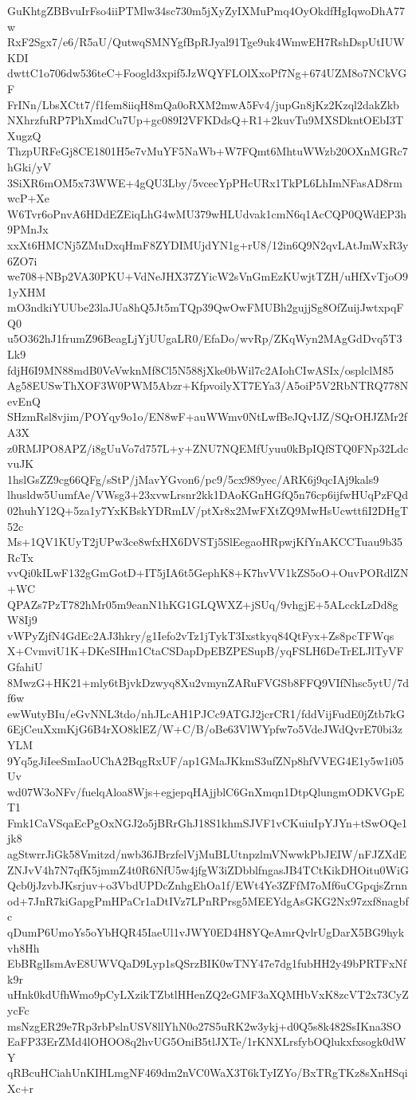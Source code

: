 GuKhtgZBBvuIrFso4iiPTMlw34sc730m5jXyZyIXMuPmq4OyOkdfHgIqwoDhA77w
RxF2Sgx7/e6/R5aU/QutwqSMNYgfBpRJyal91Tge9uk4WmwEH7RshDspUtIUWKDI
dwttC1o706dw536teC+Foogld3xpif5JzWQYFLOlXxoPf7Ng+674UZM8o7NCkVGF
FrINn/LbsXCtt7/f1fem8iiqH8mQa0oRXM2mwA5Fv4/jupGn8jKz2Kzql2dakZkb
NXhrzfuRP7PhXmdCu7Up+gc089I2VFKDdsQ+R1+2kuvTu9MXSDkntOEbI3TXugzQ
ThzpURFeGj8CE1801H5e7vMuYF5NaWb+W7FQmt6MhtuWWzb20OXnMGRc7hGki/yV
3SiXR6mOM5x73WWE+4gQU3Lby/5vcecYpPHcURx1TkPL6LhImNFasAD8rmwcP+Xe
W6Tvr6oPnvA6HDdEZEiqLhG4wMU379wHLUdvak1cmN6q1AcCQP0QWdEP3h9PMnJx
xxXt6HMCNj5ZMuDxqHmF8ZYDIMUjdYN1g+rU8/12in6Q9N2qvLAtJmWxR3y6ZO7i
we708+NBp2VA30PKU+VdNeJHX37ZYicW2sVnGmEzKUwjtTZH/uHfXvTjoO91yXHM
mO3ndkiYUUbe23laJUa8hQ5Jt5mTQp39QwOwFMUBh2gujjSg8OfZuijJwtxpqFQ0
u5O362hJ1frumZ96BeagLjYjUUgaLR0/EfaDo/wvRp/ZKqWyn2MAgGdDvq5T3Lk9
fdjH6I9MN88mdB0VeVwknMf8Cl5N588jXke0bWil7c2AIohCIwASIx/osplclM85
Ag58EUSwThXOF3W0PWM5Abzr+KfpvoilyXT7EYa3/A5oiP5V2RbNTRQ778NevEnQ
SHzmRsl8vjim/POYqy9o1o/EN8wF+auWWmv0NtLwfBeJQvIJZ/SQrOHJZMr2fA3X
z0RMJPO8APZ/i8gUuVo7d757L+y+ZNU7NQEMfUyuu0kBpIQfSTQ0FNp32LdcvuJK
1hslGsZZ9cg66QFg/sStP/jMavYGvon6/pc9/5cx989yec/ARK6j9qcIAj9kals9
lhusldw5UumfAe/VWsg3+23xvwLrsnr2kk1DAoKGnHGfQ5n76cp6ijfwHUqPzFQd
02huhY12Q+5za1y7YxKBskYDRmLV/ptXr8x2MwFXtZQ9MwHsUcwttfiI2DHgT52c
Ms+1QV1KUyT2jUPw3ce8wfxHX6DVSTj5SlEegaoHRpwjKfYnAKCCTuau9b35RcTx
vvQi0kILwF132gGmGotD+IT5jIA6t5GephK8+K7hvVV1kZS5oO+OuvPORdlZN+WC
QPAZs7PzT782hMr05m9eanN1hKG1GLQWXZ+jSUq/9vhgjE+5ALcckLzDd8gW8Ij9
vWPyZjfN4GdEc2AJ3hkry/g1Iefo2vTz1jTykT3Ixstkyq84QtFyx+Zs8pcTFWqs
X+CvmviU1K+DKeSIHm1CtaCSDapDpEBZPESupB/yqFSLH6DeTrELJlTyVFGfahiU
8MwzG+HK21+mly6tBjvkDzwyq8Xu2vmynZARuFVGSb8FFQ9VIfNhsc5ytU/7df6w
ewWutyBIu/eGvNNL3tdo/nhJLcAH1PJCc9ATGJ2jcrCR1/fddVijFudE0jZtb7kG
6EjCeuXxmKjG6B4rXO8klEZ/W+C/B/oBe63VlWYpfw7o5VdeJWdQvrE70bi3zYLM
9Yq5gJiIeeSmIaoUChA2BqgRxUF/ap1GMaJKkmS3ufZNp8hfVVEG4E1y5w1i05Uv
wd07W3oNFv/fuelqAloa8Wjs+egjepqHAjjblC6GnXmqn1DtpQlungmODKVGpET1
Fmk1CaVSqaEcPgOxNGJ2o5jBRrGhJ18S1khmSJVF1vCKuiuIpYJYn+tSwOQe1jk8
agStwrrJiGk58Vmitzd/nwb36JBrzfelVjMuBLUtnpzlmVNwwkPbJEIW/nFJZXdE
ZNJvV4h7N7qfK5jmmZ4t0R6NfU5w4jfgW3iZDbblfngasJB4TCtKikDHOitu0WiG
Qcb0jJzvbJKsrjuv+o3VbdUPDcZnhgEhOa1f/EWt4Ye3ZFfM7oMf6uCGpqjsZrnn
od+7JnR7kiGapgPmHPaCr1aDtIVz7LPnRPrsg5MEEYdgAsGKG2Nx97zxf8nagbfc
qDumP6UmoYs5oYbHQR45IaeUl1vJWY0ED4H8YQeAmrQvlrUgDarX5BG9hykvh8Hh
EbBRglIsmAvE8UWVQaD9Lyp1sQSrzBIK0wTNY47e7dg1fubHH2y49bPRTFxNfk9r
uHnk0kdUfhWmo9pCyLXzikTZbtlHHenZQ2eGMF3aXQMHbVxK8zcVT2x73CyZycFc
msNzgER29e7Rp3rbPslnUSV8llYhN0o27S5uRK2w3ykj+d0Q5s8k482SsIKna3SO
EaFP33ErZMd4lOHOO8q2hvUG5OniB5tlJXTe/1rKNXLrsfybOQlukxfxsogk0dWY
qRBcuHCiahUnKIHLmgNF469dm2nVC0WaX3T6kTyIZYo/BxTRgTKz8sXnHSqiXc+r
